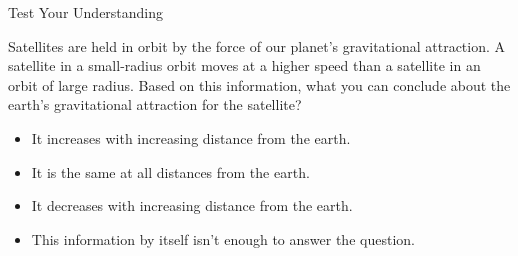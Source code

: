 \documentclass[]{beamer}
\begin{document}
\begin{frame}

     Test Your Understanding 
     \vspace{3mm}
     
     
     Satellites are held in orbit by the force of our planet’s gravitational attraction. 
     A satellite in a small-radius orbit moves at a higher speed than a satellite in an orbit
      of large radius. Based on this information, what you can conclude about the earth’s 
      gravitational attraction for the satellite?

      \vspace{3mm}

      \begin{itemize}
        \item It increases with increasing distance from the earth.
        \item It is the same at all distances from the earth.
        \item It decreases with increasing distance from the earth.
        \item This information by itself isn’t enough to answer the question.
      \end{itemize}

    \end{frame}
















 
\end{document}
